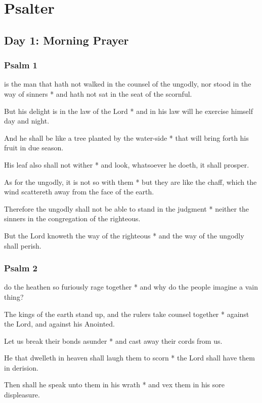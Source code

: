\section{Psalter}

\subsection{Day 1: Morning Prayer}

\subsubsection{Psalm 1}

 is the man that hath not walked in the counsel of the ungodly, nor stood in the way of sinners * and hath not sat in the seat of the scornful.

But his delight is in the law of the Lord * and in his law will he exercise himself day and night.

And he shall be like a tree planted by the water-side * that will bring forth his fruit in due season.

His leaf also shall not wither * and look, whatsoever he doeth, it shall prosper.

As for the ungodly, it is not so with them * but they are like the chaff, which the wind scattereth away from the face of the earth.

Therefore the ungodly shall not be able to stand in the judgment * neither the sinners in the congregation of the righteous.

But the Lord knoweth the way of the righteous * and the way of the ungodly shall perish.

\subsubsection{Psalm 2}

 do the heathen so furiously rage together * and why do the people imagine a vain thing?

The kings of the earth stand up, and the rulers take counsel together * against the Lord, and against his Anointed.

Let us break their bonds asunder * and cast away their cords from us.

He that dwelleth in heaven shall laugh them to scorn * the Lord shall have them in derision.

Then shall he speak unto them in his wrath * and vex them in his sore displeasure.


